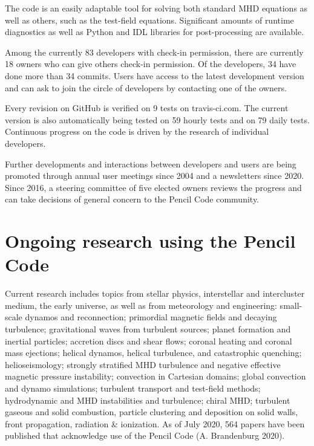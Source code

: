 \documentclass[10pt,a4paper,onecolumn]{article}
\begin{document}
The code is an easily adaptable tool for solving both standard MHD
equations as well as others, such as the test-field equations.
Significant amounts of runtime diagnostics as well as Python and IDL
libraries for post-processing are available.

Among the currently 83 developers with check-in permission, there are
currently 18 owners who can give others check-in permission. Of the
developers, 34 have done more than 34 commits. Users have access to the
latest development version and can ask to join the circle of developers
by contacting one of the owners.

Every revision on GitHub is verified on 9 tests on travis-ci.com. The
current version is also automatically being tested on 59 hourly tests
and on 79 daily tests. Continuous progress on the code is driven by the
research of individual developers.

Further developments and interactions between developers and users are
being promoted through annual user meetings since 2004 and a newsletters
since 2020. Since 2016, a steering committee of five elected owners
reviews the progress and can take decisions of general concern to the
Pencil Code community.

\hypertarget{ongoing-research-using-the-pencil-code}{%
\section{Ongoing research using the Pencil
Code}\label{ongoing-research-using-the-pencil-code}}

Current research includes topics from stellar physics, interstellar and
intercluster medium, the early universe, as well as from meteorology and
engineering: small-scale dynamos and reconnection; primordial magnetic
fields and decaying turbulence; gravitational waves from turbulent
sources; planet formation and inertial particles; accretion discs and
shear flows; coronal heating and coronal mass ejections; helical
dynamos, helical turbulence, and catastrophic quenching;
helioseismology; strongly stratified MHD turbulence and negative
effective magnetic pressure instability; convection in Cartesian
domains; global convection and dynamo simulations; turbulent transport
and test-field methods; hydrodynamic and MHD instabilities and
turbulence; chiral MHD; turbulent gaseous and solid combustion, particle
clustering and deposition on solid walls, front propagation, radiation
\& ionization. As of July 2020, 564 papers have been published that
acknowledge use of the Pencil Code (A. Brandenburg 2020).
\end{document}

